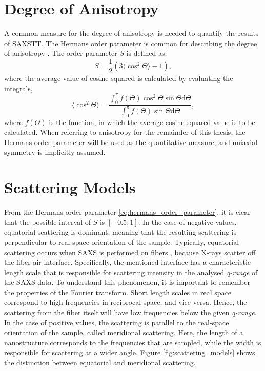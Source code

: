 \section{Degree of Anisotropy} %

A common measure for the degree of anisotropy is needed to quantify the results of SAXSTT.
The Hermans order parameter is common for describing the degree of anisotropy \cite{yoshiharu1997cellulose}.
The order parameter $S$ is defined as,
\begin{equation}\label{eq:hermans_order_parameter}
    S = \frac{1}{2} \left( 3 \langle\cos^{2} \Theta\rangle - 1 \right),
\end{equation}
where the average value of cosine squared is calculated by evaluating the integrals,
\begin{equation}
    \langle\cos^{2} \Theta\rangle = \frac{ \int_{0}^{\pi} f (\Theta) \cos^{2} \Theta \sin \Theta  \mathrm{d}\Theta  }
    {\int_{0}^{\pi} f (\Theta) \sin \Theta  \mathrm{d}\Theta },
\end{equation}
\noindent
where $f(\Theta)$ is the function, in which the average cosine squared value is to be calculated.
When referring to anisotropy for the remainder of this thesis, the Hermans order parameter will be used as the quantitative measure,
and uniaxial symmetry is implicitly assumed. %

\clearpage
\section{Scattering Models}
From the Hermans order parameter \eqref{eq:hermans_order_parameter}, it is clear that the possible interval of $S$ is $[-0.5, 1]$.
In the case of negative values, equatorial scattering is dominant, meaning that the resulting scattering is perpendicular to real-space orientation of the sample.
Typically, equatorial scattering occurs when SAXS is performed on fibers \cite{li2013quantitative}, because X-rays scatter off the fiber-air interface.
Specifically, the mentioned interface has a characteristic length scale that is responsible for scattering intensity in the analysed \emph{q-range} of the SAXS data.
To understand this phenomenon, it is important to remember the properties of the Fourier transform.
Short length scales in real space correspond to high frequencies in reciprocal space, and vice versa.
Hence, the scattering from the fiber itself will have low frequencies below the given \emph{q-range}.
In the case of positive values, the scattering is parallel to the real-space orientation of the sample, called meridional scattering.
Here, the length of a nanostructure corresponds to the frequencies that are sampled, while the width is responsible for scattering at a wider angle.
Figure \ref{fig:scattering_models} shows the distinction between equatorial and meridional scattering.

